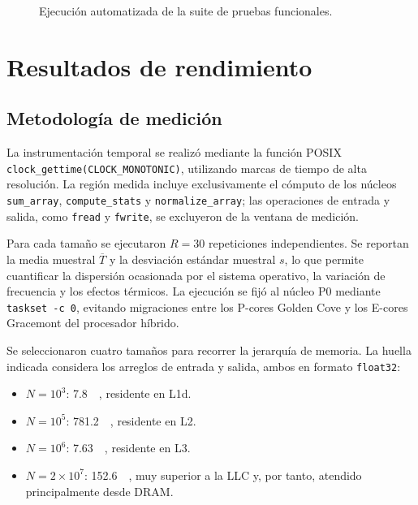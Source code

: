\documentclass[journal]{IEEEtran}
\begin{document}
\begin{figure}[H]
  \centering
  \caption{Ejecución automatizada de la suite de pruebas funcionales.}
  \label{fig:suite-pruebas}
\end{figure}

\section{Resultados de rendimiento}

\subsection{Metodología de medición}

La instrumentación temporal se realizó mediante la función POSIX
\texttt{clock\_gettime(CLOCK\_MONOTONIC)}, utilizando marcas de tiempo de alta
resolución. La región medida incluye exclusivamente el cómputo de los núcleos
\texttt{sum\_array}, \texttt{compute\_stats} y
\texttt{normalize\_array}; las operaciones de entrada y salida, como
\texttt{fread} y \texttt{fwrite}, se excluyeron de la ventana de medición.

Para cada tamaño se ejecutaron $R=30$ repeticiones independientes. Se reportan
la media muestral $\overline{T}$ y la desviación estándar muestral $s$, lo que
permite cuantificar la dispersión ocasionada por el sistema operativo, la
variación de frecuencia y los efectos térmicos. La ejecución se fijó al núcleo
P0 mediante \texttt{taskset -c 0}, evitando migraciones entre los P-cores Golden
Cove y los E-cores Gracemont del procesador híbrido.

Se seleccionaron cuatro tamaños para recorrer la jerarquía de memoria. La
huella indicada considera los arreglos de entrada y salida, ambos en formato
\texttt{float32}:
\begin{itemize}
  \item $N=10^3$: \SI{7.8}{\kibi\byte}, residente en L1d.
  \item $N=10^5$: \SI{781.2}{\kibi\byte}, residente en L2.
  \item $N=10^6$: \SI{7.63}{\mebi\byte}, residente en L3.
  \item $N=2\times10^7$: \SI{152.6}{\mebi\byte}, muy superior a la LLC y,
  por tanto, atendido principalmente desde DRAM.
\end{itemize}
\end{document}
